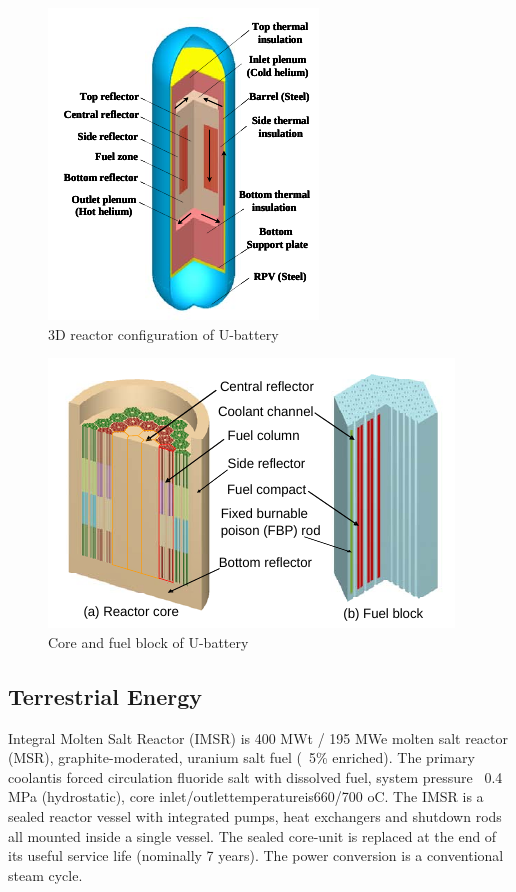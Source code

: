 \begin{figure}[htbp]
\centering
\includegraphics[scale=1]{Figs/ubattery3d.jpeg}
\caption{ 3D reactor configuration of U-battery}
\label{u3d}
\end{figure}

\begin{figure}[htbp]
\centering
\includegraphics[scale=1]{Figs/ubatterycore.jpeg}
\caption{ Core and fuel block of U-battery}
\label{ucore}
\end{figure}


\pagebreak
\subsection{Terrestrial Energy}
Integral Molten Salt Reactor (IMSR) is 400 MWt / 195 MWe molten salt reactor (MSR), graphite-moderated, uranium salt fuel (~5\% enriched). The primary coolantis forced circulation fluoride salt with dissolved fuel, system pressure ~0.4 MPa (hydrostatic), core inlet/outlettemperatureis660/700 oC. The IMSR is a sealed reactor vessel with integrated pumps, heat exchangers and shutdown rods all mounted inside a single vessel. The sealed core-unit is replaced at the end of its useful service life (nominally 7 years). The power conversion is a conventional steam cycle.

